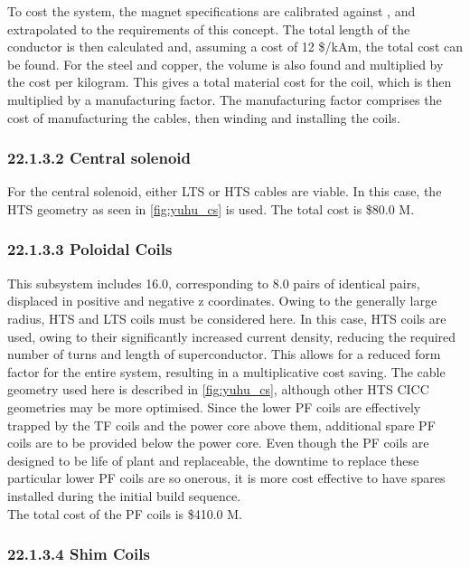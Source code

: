 To cost the system, the magnet specifications are calibrated against \cite{Menard2016}, and extrapolated to the requirements of this concept. The total length of the conductor is then calculated and, assuming a cost of 12 \$/kAm, the total cost can be found. For the steel and copper, the volume is also found and multiplied by the cost per kilogram. This gives a total material cost for the coil, which is then multiplied by a manufacturing factor. The manufacturing factor comprises the cost of manufacturing the cables, then winding and installing the coils. 

\subsubsection*{22.1.3.2 Central solenoid}

For the central solenoid, either LTS or HTS cables are viable. In this case, the HTS geometry as seen in \ref{fig:yuhu_cs} is used. The total cost is \$80.0 M.

\subsubsection*{22.1.3.3 Poloidal Coils}

This subsystem includes 16.0, corresponding to 8.0 pairs of identical pairs, displaced in positive and negative z coordinates. Owing to the generally large radius, HTS and LTS coils must be considered here. In this case, HTS coils are used, owing to their significantly increased current density, reducing the required number of turns and length of superconductor. This allows for a reduced form factor for the entire system, resulting in a multiplicative cost saving. The cable geometry used here is described in \ref{fig:yuhu_cs}, although other HTS CICC geometries may be more optimised.
Since the lower PF coils are effectively trapped by the TF coils and the power core above them, additional spare PF coils are to be provided below the power core. Even though the PF coils are designed to be life of plant and replaceable, the downtime to replace these particular lower PF coils are so onerous, it is more cost effective to have spares installed during the initial build sequence.  \\

The total cost of the PF coils is \$410.0 M. 

\subsubsection*{22.1.3.4 Shim Coils}


